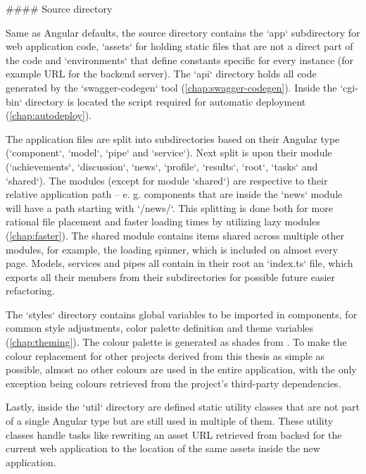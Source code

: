 \documentclass[
  digital, %
  oneside, %
  lof,     %
  nolot,     %
]{fithesis4}
\begin{document}
{#### Source directory

Same as Angular defaults, the source directory contains the `app` subdirectory for web application code, `assets` for holding static files that are not a direct part of the code and `environments` that define constants specific for every instance (for example \acrshort{URL} for the backend server). The `api` directory holds all code generated by the `swagger-codegen` tool (\autoref{chap:swagger-codegen}). Inside the `cgi-bin` directory is located the script required for automatic deployment (\autoref{chap:autodeploy}).

The application files are split into subdirectories based on their Angular type (`component`, `model`, `pipe` and `service`). Next split is upon their module (`achievements`, `discussion`, `news`, `profile`, `results`, `root`, `tasks` and `shared`). The modules (except for module `shared`) are respective to their relative application path -- e. g. components that are inside the `news` module will have a path starting with `/news/`. This splitting is done both for more rational file placement and faster loading times by utilizing lazy modules (\autoref{chap:faster}). The shared module contains items shared across multiple other modules, for example, the loading spinner, which is included on almost every page. Models, services and pipes all contain in their root an `index.ts` file, which exports all their members from their subdirectories for possible future easier refactoring.

The `styles` directory contains global variables to be imported in components,  for common style adjustments, color palette definition and theme variables (\autoref{chap:theming}). The colour palette is generated as shades from . To make the colour replacement for other projects derived from this thesis as simple as possible, almost no other colours are used in the entire application, with the only exception being colours retrieved from the project's third-party dependencies.

Lastly, inside the `util` directory are defined static utility classes that are not part of a single Angular type but are still used in multiple of them. These utility classes handle tasks like rewriting an asset \acrshort{URL} retrieved from backed for the current web application to the location of the same assets inside the new application.

}
\end{document}
